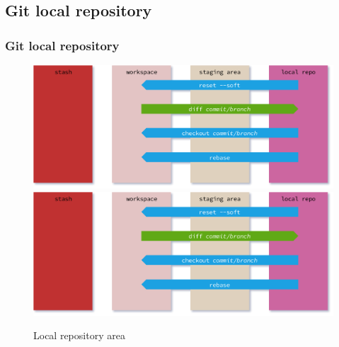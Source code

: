 \subsection*{Git local repository}
\begin{frame}[fragile]
    \frametitle{Git local repository}
    \begin{figure}
        \begin{center}
            {
                \includegraphics[width=1\textwidth,keepaspectratio]{./images/GitAreas-LocalRepo.png}
            }
            {
                \includegraphics[height=0.75\textheight,keepaspectratio]{./images/GitAreas-LocalRepo.png}
            }
            \caption{Local repository area}
        \end{center}
    \end{figure}
\end{frame}

